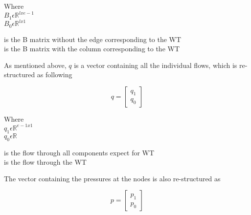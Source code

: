 \begin{minipage}[t]{0.20\textwidth}
Where\\
\hspace*{8mm} $B_1 \epsilon \mathbb{R}^{lxe-1}$  \\
\hspace*{8mm} $B_0 \epsilon \mathbb{R}^{lx1} $ 
\end{minipage}
\begin{minipage}[t]{0.68\textwidth}
\vspace*{2mm}
\hspace*{4mm} is the B matrix without the edge corresponding to the WT\\
\hspace*{4mm} is the B matrix with the column corresponding to the WT 
\end{minipage}

As mentioned above, $q$ is a vector containing all the individual flows, which 
is re-structured as following

\begin{equation}
q =
\begin{bmatrix}
         q_1 \\
	q_0 
\end{bmatrix}
\end{equation}

\begin{minipage}[t]{0.20\textwidth}
Where\\
\hspace*{8mm} $q_1 \epsilon \mathbb{R}^{e-1x1}$  \\
\hspace*{8mm} $q_0 \epsilon \mathbb{R} $ 
\end{minipage}
\begin{minipage}[t]{0.68\textwidth}
\vspace*{2mm}
\hspace*{4mm} is the flow through all components expect for WT\\
\hspace*{4mm} is the flow through the WT 
\end{minipage}

The vector containing the pressures at the nodes is also re-structured as

\begin{equation}
p =
\begin{bmatrix}
         p_1 \\
	p_0 
\end{bmatrix}
\end{equation}

